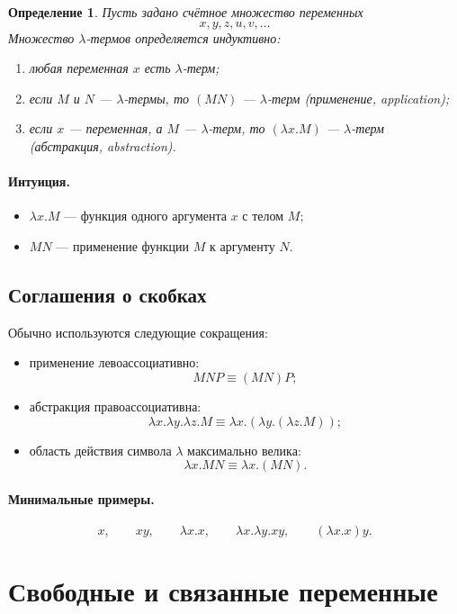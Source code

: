\documentclass[12pt,a4paper]{article}
\newtheorem{definition}{Определение}
\theoremstyle{remark}
\begin{document}
\begin{definition}
Пусть задано счётное множество переменных
\[
x,y,z,u,v,\dots
\]
Множество $\lambda$-термов определяется индуктивно:
\begin{enumerate}
    \item любая переменная $x$ есть $\lambda$-терм;
    \item если $M$ и $N$ --- $\lambda$-термы, то $(MN)$ --- $\lambda$-терм (применение, \emph{application});
    \item если $x$ --- переменная, а $M$ --- $\lambda$-терм, то $(\lambda x.M)$ --- $\lambda$-терм (абстракция, \emph{abstraction}).
\end{enumerate}
\end{definition}

\paragraph{Интуиция.}
\begin{itemize}
    \item $\lambda x.M$ --- функция одного аргумента $x$ с телом $M$;
    \item $MN$ --- применение функции $M$ к аргументу $N$.
\end{itemize}

\subsection{Соглашения о скобках}

Обычно используются следующие сокращения:

\begin{itemize}
    \item применение левоассоциативно:
    \[
    MNP \equiv (MN)P;
    \]
    \item абстракция правоассоциативна:
    \[
    \lambda x.\lambda y.\lambda z.M \equiv \lambda x.(\lambda y.(\lambda z.M));
    \]
    \item область действия символа $\lambda$ максимально велика:
    \[
    \lambda x.MN \equiv \lambda x.(MN).
    \]
\end{itemize}

\paragraph{Минимальные примеры.}
\[
x,\qquad xy,\qquad \lambda x.x,\qquad \lambda x.\lambda y.xy,\qquad (\lambda x.x)y.
\]

\section{Свободные и связанные переменные}
\end{document}

